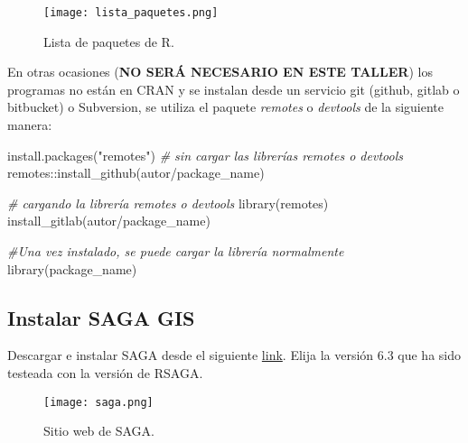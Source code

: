 \documentclass[
]{article}
\newenvironment{Shaded}{\begin{snugshade}}{\end{snugshade}}
\newcommand{\CommentTok}[1]{\textcolor[rgb]{0.56,0.35,0.01}{\textit{#1}}}
\newcommand{\FunctionTok}[1]{\textcolor[rgb]{0.00,0.00,0.00}{#1}}
\newcommand{\NormalTok}[1]{#1}
\newcommand{\SpecialCharTok}[1]{\textcolor[rgb]{0.00,0.00,0.00}{#1}}
\newcommand{\StringTok}[1]{\textcolor[rgb]{0.31,0.60,0.02}{#1}}
\begin{document}
\begin{figure}
\centering
\texttt{[image: lista\_paquetes.png]}
\caption{Lista de paquetes de R.\label{fig2}}
\end{figure}

En otras ocasiones (\textbf{NO SERÁ NECESARIO EN ESTE TALLER}) los
programas no están en CRAN y se instalan desde un servicio git (github,
gitlab o bitbucket) o Subversion, se utiliza el paquete \emph{remotes} o
\emph{devtools} de la siguiente manera:

\begin{Shaded}
\begin{Highlighting}[]
\FunctionTok{install.packages}\NormalTok{(}\StringTok{"remotes"}\NormalTok{)}
\CommentTok{\# sin cargar las librerías remotes o devtools}
\NormalTok{remotes}\SpecialCharTok{::}\FunctionTok{install\_github}\NormalTok{(}\StringTok{\textquotesingle{}autor/package\_name\textquotesingle{}}\NormalTok{)}

\CommentTok{\# cargando la librería remotes o devtools}
\FunctionTok{library}\NormalTok{(remotes)}
\FunctionTok{install\_gitlab}\NormalTok{(}\StringTok{\textquotesingle{}autor/package\_name\textquotesingle{}}\NormalTok{)}

\CommentTok{\#Una vez instalado, se puede cargar la librería normalmente}
\FunctionTok{library}\NormalTok{(package\_name)}
\end{Highlighting}
\end{Shaded}

\hypertarget{instalar-saga-gis}{%
\subsection{Instalar SAGA GIS}\label{instalar-saga-gis}}

Descargar e instalar SAGA desde el siguiente
\href{https://sourceforge.net/projects/saga-gis/files/}{link}. Elija la
versión 6.3 que ha sido testeada con la versión de RSAGA.

\begin{figure}
\centering
\texttt{[image: saga.png]}
\caption{Sitio web de SAGA.}
\end{figure}
\end{document}
